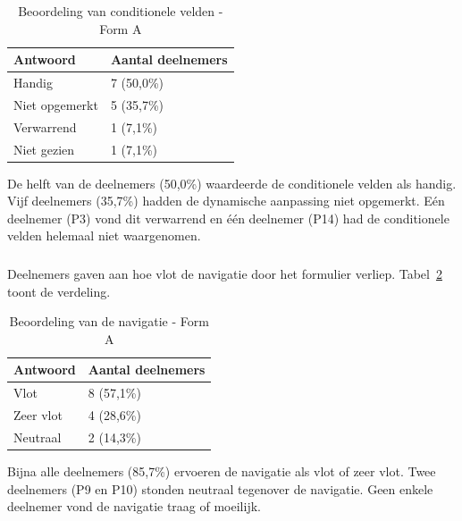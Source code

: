 \begin{table}[h]
  \centering
  \caption[Beoordeling conditionele velden vroege test Form A]{Beoordeling van conditionele velden - Form A}
  \label{tab:vroeg-conditioneel}
  \begin{tabular}{ll}
    \hline
    \textbf{Antwoord} & \textbf{Aantal deelnemers} \\
    \hline
    Handig         & 7 (50,0\%) \\
    Niet opgemerkt & 5 (35,7\%) \\
    Verwarrend     & 1 (7,1\%)  \\
    Niet gezien    & 1 (7,1\%)  \\
    \hline
  \end{tabular}
\end{table}

De helft van de deelnemers (50,0\%) waardeerde de conditionele velden als handig. Vijf deelnemers (35,7\%) hadden de dynamische aanpassing niet opgemerkt. Eén deelnemer (P3) vond dit verwarrend en één deelnemer (P14) had de conditionele velden helemaal niet waargenomen.

\subsubsection{}

Deelnemers gaven aan hoe vlot de navigatie door het formulier verliep. Tabel~\ref{tab:vroeg-navigatie} toont de verdeling.

\begin{table}[h]
  \centering
  \caption[Beoordeling navigatie vroege test Form A]{Beoordeling van de navigatie - Form A}
  \label{tab:vroeg-navigatie}
  \begin{tabular}{ll}
    \hline
    \textbf{Antwoord} & \textbf{Aantal deelnemers} \\
    \hline
    Vlot      & 8 (57,1\%) \\
    Zeer vlot & 4 (28,6\%) \\
    Neutraal  & 2 (14,3\%) \\
    \hline
  \end{tabular}
\end{table}

Bijna alle deelnemers (85,7\%) ervoeren de navigatie als vlot of zeer vlot. Twee deelnemers (P9 en P10) stonden neutraal tegenover de navigatie. Geen enkele deelnemer vond de navigatie traag of moeilijk.

\subsection{}

